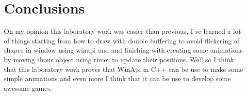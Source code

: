 \section*{Conclusions}

On my opinion this laboratory work was easier than previous, I've learned a lot of things starting from how to draw with double buffering to avoid flickering of shapes in window using winapi and and finishing with creating some animations by moving thous object using timer to update their positions. Well so I think that this laboratory work proves that WinApi in C++ can be use to make some simple animations and even more I think that it can be use to develop some awesome games.

\clearpage